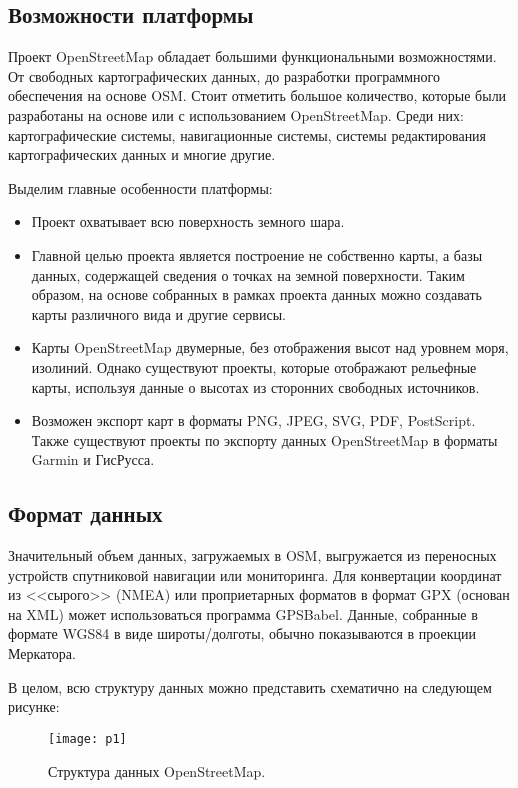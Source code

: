 \subsection{Возможности платформы}
Проект OpenStreetMap обладает большими функциональными возможностями. От 
свободных картографических данных, до разработки программного обеспечения на 
основе OSM. Стоит отметить большое количество, которые были разработаны на 
основе или с использованием OpenStreetMap. Среди них: картографические 
системы, навигационные системы, системы редактирования картографических данных 
и многие другие.\cite{osmwiki}

Выделим главные особенности платформы:
\begin{itemize}
    \item Проект охватывает всю поверхность земного шара.
    \item Главной целью проекта является построение не собственно карты, а 
        базы данных, содержащей сведения о точках на земной поверхности. Таким 
        образом, на основе собранных в рамках проекта данных можно создавать 
        карты различного вида и другие сервисы.
    \item Карты OpenStreetMap двумерные, без отображения высот над уровнем 
        моря, изолиний. Однако существуют проекты, которые отображают 
        рельефные карты, используя данные о высотах из сторонних свободных 
        источников.
    \item Возможен экспорт карт в форматы PNG, JPEG, SVG, PDF, PostScript. 
        Также существуют проекты по экспорту данных OpenStreetMap в форматы 
        Garmin и ГисРусса.
\end{itemize}

\subsection{Формат данных}
Значительный объем данных, загружаемых в OSM, выгружается из переносных 
устройств спутниковой навигации или мониторинга. Для конвертации координат 
из <<сырого>> (NMEA) или проприетарных форматов в формат GPX (основан на XML) 
может использоваться программа GPSBabel. Данные, собранные в формате WGS84 в 
виде широты/долготы, обычно показываются в проекции Меркатора\cite{projection}.

В целом, всю структуру данных можно представить схематично на следующем рисунке:
\begin{figure}[ht!]
    \center
    \texttt{[image: p1]}
    \caption{Структура данных OpenStreetMap.}
\end{figure}

